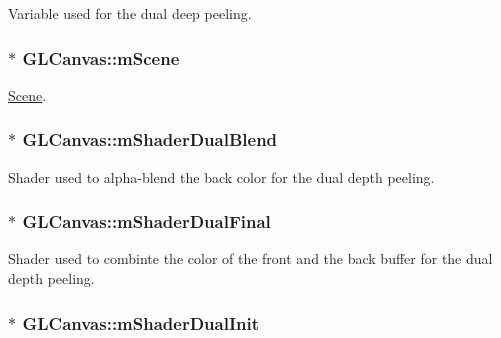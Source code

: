 Variable used for the dual deep peeling. 

\hypertarget{class_g_l_canvas_ad14c80647484e0ab65732ba971ed7b84}{
\subsubsection[{m\+Scene}]{$\ast$ G\+L\+Canvas\+::m\+Scene\hspace{0.3cm}{\ttfamily [private]}}}\label{class_g_l_canvas_ad14c80647484e0ab65732ba971ed7b84}


\hyperlink{class_scene}{Scene}. 

\hypertarget{class_g_l_canvas_a63597026b7698a27ca2b65947b07a8c4}{
\subsubsection[{m\+Shader\+Dual\+Blend}]{$\ast$ G\+L\+Canvas\+::m\+Shader\+Dual\+Blend\hspace{0.3cm}{\ttfamily [private]}}}\label{class_g_l_canvas_a63597026b7698a27ca2b65947b07a8c4}


Shader used to alpha-\/blend the back color for the dual depth peeling. 

\hypertarget{class_g_l_canvas_a3da4afa0d1f292dddd869dffc7b5e5ec}{
\subsubsection[{m\+Shader\+Dual\+Final}]{$\ast$ G\+L\+Canvas\+::m\+Shader\+Dual\+Final\hspace{0.3cm}{\ttfamily [private]}}}\label{class_g_l_canvas_a3da4afa0d1f292dddd869dffc7b5e5ec}


Shader used to combinte the color of the front and the back buffer for the dual depth peeling. 

\hypertarget{class_g_l_canvas_adad92626cf28f8115762dc7f1b6ddc04}{
\subsubsection[{m\+Shader\+Dual\+Init}]{$\ast$ G\+L\+Canvas\+::m\+Shader\+Dual\+Init\hspace{0.3cm}{\ttfamily [private]}}}\label{class_g_l_canvas_adad92626cf28f8115762dc7f1b6ddc04}


